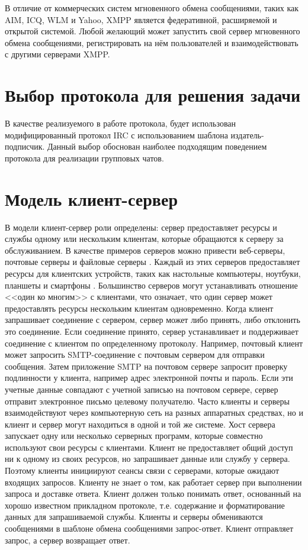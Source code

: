 В отличие от коммерческих систем мгновенного обмена сообщениями, таких как AIM, ICQ, WLM и Yahoo, XMPP является федеративной, расширяемой и открытой системой. Любой желающий может запустить свой сервер мгновенного обмена сообщениями, регистрировать на нём пользователей и взаимодействовать с другими серверами XMPP.

\section{Выбор протокола для решения задачи}

В качестве реализуемого в работе протокола, будет использован модифицированный протокол IRC с использованием шаблона издатель-подписчик. Данный выбор обоснован наиболее подходящим поведением протокола для реализации групповых чатов.

\section{Модель клиент-сервер}

В модели клиент-сервер роли определены: сервер предоставляет ре­сурсы и службы одному или нескольким клиентам, которые обращаются к серверу за обслуживанием. В качестве примеров серверов можно привести веб­-серверы, почтовые серверы и файловые серверы . Каждый из этих серверов предоставляет ресурсы для клиентских устройств, таких как настольные ком­пьютеры, ноутбуки, планшеты и смартфоны . Большинство серверов могут устанавливать отношение <<один ко многим>> с клиентами, что означает, что один сервер может предоставлять ресурсы нескольким клиентам одновремен­но. Когда клиент запрашивает соединение с сервером, сервер может либо принять, либо отклонить это соединение. Если соединение принято, сервер устанавливает и поддерживает соединение с клиентом по определенному про­токолу. Например, почтовый клиент может запросить SMTP-соединение с почтовым сервером для отправки сообщения. Затем приложение SMTP на почтовом сервере запросит проверку подлинности у клиента, например адрес электронной почты и пароль. Если эти учетные данные совпадают с учетной записью на почтовом сервере, сервер отправит электронное письмо целевому получателю. Часто клиенты и серверы взаимодействуют через компьютерную сеть на разных аппаратных средствах, но и клиент и сервер могут находиться в одной и той же системе. Хост сервера запускает одну или несколько серверных программ, которые совместно используют свои ресурсы с клиентами. Клиент не предоставляет общий доступ ни к одному из своих ресурсов, но запраши­вает данные или службу у сервера. Поэтому клиенты инициируют сеансы связи с серверами, которые ожидают входящих запросов. Клиенту не знает о том, как работает сервер при выполнении запроса и доставке ответа. Клиент должен только понимать ответ, основанный на хорошо известном прикладном протоколе, т.е. содержание и форматирование данных для запрашиваемой службы. Клиенты и серверы обмениваются сообщениями в шаблоне обмена сообщениями запрос-ответ. Клиент отправляет запрос, а сервер возвращает ответ.

